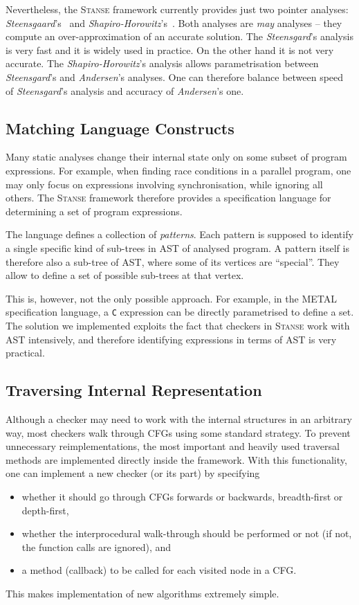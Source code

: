 \documentclass{llncs}
\newcommand{\Stanse}{\textsc{Stanse}\xspace}
\begin{document}
Nevertheless, the \Stanse framework currently provides just two pointer
analyses: \textit{Steensgaard}'s~\cite{SG96} and
\textit{Shapiro-Horowitz}'s~\cite{SH97}. Both analyses are \emph{may} analyses
-- they compute an over-approximation of an accurate solution. The
\textit{Steensgard}'s analysis is very fast and it is widely used in practice.
On the other hand it is not very accurate. The \textit{Shapiro-Horowitz}'s
analysis allows parametrisation between \textit{Steensgard}'s and
\textit{Andersen}'s analyses. One can therefore balance between speed of
\textit{Steensgard}'s analysis and accuracy of \textit{Andersen}'s one.


\subsection{Matching Language Constructs}

Many static analyses change their internal state only on some subset of
program expressions. For example, when finding race conditions in a
parallel program, one may only focus on expressions involving synchronisation,
while ignoring all others. The \Stanse framework therefore provides a
specification language for determining a set of program expressions.

The language defines a collection of \emph{patterns}. Each pattern is supposed
to identify a single specific kind of sub-trees in AST of analysed program. A
pattern itself is therefore also a sub-tree of AST, where some of its vertices
are ``special''. They allow to define a set of possible sub-trees at that
vertex.

This is, however, not the only possible approach. For example, in the
METAL~\cite{METAL} specification language, a \texttt{C} expression can be
directly parametrised to define a set. The solution we implemented exploits
the fact that checkers in \Stanse work with AST intensively, and therefore
identifying expressions in terms of AST is very practical.

\subsection{Traversing Internal Representation}
\label{ssec:travers}

Although a checker may need to work with the internal structures in an
arbitrary way, most checkers walk through CFGs using some standard
strategy. To prevent unnecessary reimplementations, the most important and
heavily used traversal methods are implemented directly inside the framework.
With this functionality, one can implement a new checker (or its part) by
specifying
\begin{itemize}
\item whether it should go through CFGs forwards or backwards, breadth-first
  or depth-first,
\item whether the interprocedural walk-through should be performed or not (if
  not, the function calls are ignored), and
\item a method (callback) to be called for each visited node in a CFG.
\end{itemize}
This makes implementation of new algorithms extremely simple.
\end{document}
